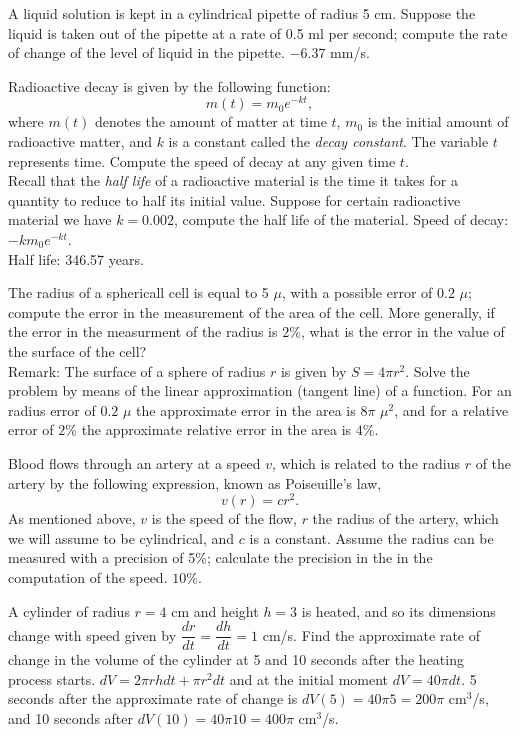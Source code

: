 {A liquid solution is kept in a cylindrical pipette of radius 5 cm.
Suppose the liquid is taken out of the pipette at a rate of 0.5 ml per second;
compute the rate of change of the level of liquid in the pipette.
}
{$-6.37$ mm/s.
}
{
}


{Radioactive decay is given by the following function:
\[
m(t) = m_0e^{-kt},
\]
where $m(t)$ denotes the amount of matter at time $t$, $m_0$ is the initial amount of radioactive matter, and $k$ is a constant called the
\emph{decay constant}.
The variable $t$ represents time.
Compute the speed of decay at any given time $t$.\\
Recall that the \emph{half life} of a radioactive material is the time it takes for a quantity to reduce to half its initial value.
Suppose for certain radioactive material we have $k=0.002$, compute the half life of the material.
}
{Speed of decay: $-km_0e^{-kt}$.\\
Half life: 346.57 years.
}
{
}


{The radius of a sphericall cell is equal to 5 $\mu$, with a possible error of $0.2$ $\mu$; compute the error in the measurement of the
area of the cell.
More generally, if the error in the measurment of the radius is $2\%$, what is the error in the value of the surface of
the cell?\\
Remark: The surface of a sphere of radius $r$ is given by $S=4\pi r^2$.
Solve the problem by means of the linear approximation (tangent line) of a function.
}
{For an radius error of $0.2$ $\mu$ the approximate error in the area is $8\pi$ $\mu^2$, and for a relative error of $2\%$
the approximate relative error in the area is $4\%$.}
{
}


{Blood flows through an artery at a speed $v$, which is related to the radius $r$ of the artery by the following expression, known as
Poiseuille's law,
\[
v(r) = cr^2.
\]
As mentioned above, $v$ is the speed of the flow, $r$ the radius of the artery, which we will assume to be cylindrical, and $c$ is a constant.
Assume the radius can be measured with a precision of 5\%; calculate the precision in the in the computation of the speed.
}
{$10\%$.
}
{
}


{A cylinder of radius $r = 4$ cm and height $h = 3$ is heated, and so its dimensions change with speed given by $\dfrac{dr}{dt}=\dfrac{dh}{dt}= 1$ cm/s.
Find the approximate rate of change in the volume of the cylinder at 5 and 10 seconds after the heating process starts.
}
{$dV = 2\pi r h dt + \pi r^2 dt$ and at the initial moment $dV = 40\pi dt$. 5 seconds after the approximate rate of change is $dV(5) = 40\pi 5 = 200\pi$ cm$^3$/s, and 10 seconds after $dV(10) = 40\pi 10 = 400\pi$ cm$^3$/s.
}
{
}


